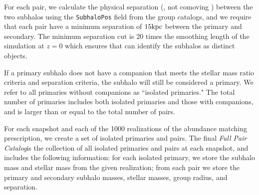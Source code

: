 \documentclass[twocolumn]{aastex631}
\newcommand{\paircat}{\textit{Full Pair Catalog}}
\begin{document}
        For each pair, we calculate the physical separation (\kpc, not comoving \kpc) between the two subhalos using the \texttt{SubhaloPos} field from the group catalogs, and we require that each pair have a minimum separation of $15 \mathrm{kpc}$ between the primary and secondary.
        The minimum separation cut is 20 times the smoothing length of the simulation at $z=0$ which ensures that \subfind can identify the subhalos as distinct objects. 

        If a primary subhalo does not have a companion that meets the stellar mass ratio criteria and separation criteria, the subhalo will still be considered a primary. 
        We refer to all primaries without companions as ``isolated primaries."
        The total number of primaries includes both isolated primaries and those with companions, and is larger than or equal to the total number of pairs.

        For each snapshot and each of the 1000 realizations of the abundance matching prescription, we create a set of isolated primaries and pairs. 
        The final \paircat is the collection of all isolated primaries and pairs at each snapshot, and includes the following information: for each isolated primary, we store the subhalo mass and stellar mass from the given realization; from each pair we store the primary and secondary subhalo masses, stellar masses, group radius, and separation.
        

\end{document}
